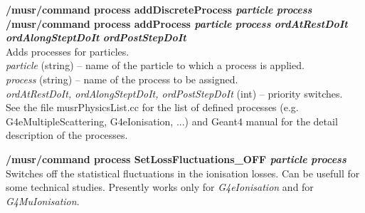 \documentclass[twoside]{dis04}
\begin{document}
\begin{description}
\item{\bf /musr/command process addDiscreteProcess \emph{particle} \emph{process}}\\
{\bf /musr/command process addProcess \emph{particle} \emph{process} \emph{ordAtRestDoIt} \emph{ordAlongSteptDoIt} \emph{ordPostStepDoIt}}\\
	Adds processes for particles. \\
	\emph{particle} (string) -- name of the particle to which a process is applied.\\
	\emph{process} (string) -- name of the process to be assigned.\\
	\emph{ordAtRestDoIt, ordAlongSteptDoIt, ordPostStepDoIt} (int) -- priority switches.\\
	See the file musrPhysicsList.cc for the list of defined processes (e.g. G4eMultipleScattering,
	G4eIonisation, ...) and Geant4 manual for the detail description of the processes.

\item{\bf /musr/command process SetLossFluctuations\_OFF \emph{particle} \emph{process}}\\
        Switches off the statistical fluctuations in the ionisation losses.  Can be usefull
	for some technical studies.  Presently works only for \emph{G4eIonisation} and
	for \emph{G4MuIonisation}.


\end{description}
\end{document}
